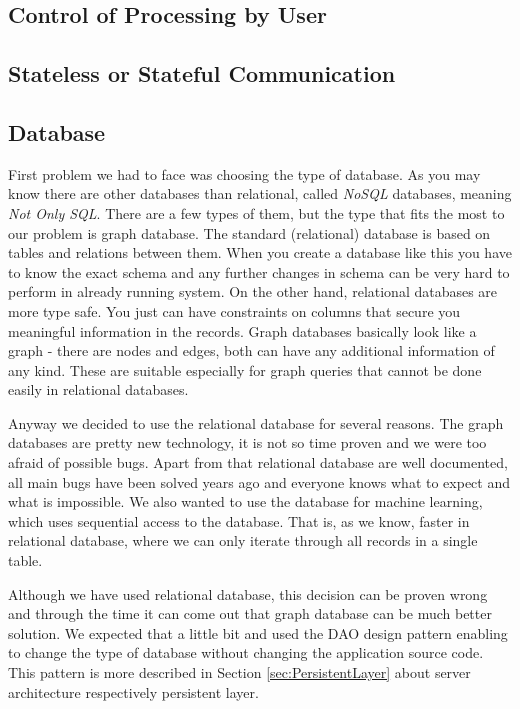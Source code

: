 \subsection{Control of Processing by User}
\label{ssec:ReportPipeline}


\subsection{Stateless or Stateful Communication}



\subsection{Database}


First problem we had to face was choosing the type of database. As you may know
there are other databases than relational, called \emph{NoSQL} databases,
meaning \emph{Not Only SQL}. There are a few types of them, but the type that
fits the most to our problem is graph database. The standard (relational)
database is based on tables and relations between them. When you create a
database like this you have to know the exact schema and any further changes in
schema can be very hard to perform in already running system. On the other hand,
relational databases are more type safe. You just can have constraints on
columns that secure you meaningful information in the records. Graph databases
basically look like a graph - there are nodes and edges, both can have any
additional information of any kind. These are suitable especially for graph
queries that cannot be done easily in relational databases.

Anyway we decided to use the relational database for several reasons.
The graph databases are pretty new technology, it is not so time proven and we
were too afraid of  possible bugs. Apart from that relational database are well
documented, all main bugs have been solved years ago and everyone knows what to
expect and what is impossible.
We also wanted to use the database for machine learning, which uses sequential
access to the database. That is, as we know, faster in relational database,
where we can only iterate through all records in a single table.

Although we have used relational database, this decision can be proven wrong and
through the time it can come out that graph database can be much better
solution. We expected that a little bit and used the DAO design pattern enabling
to change the type of database without changing the application source code.
This pattern is more described in Section \ref{sec:PersistentLayer} about server
architecture respectively persistent layer.
